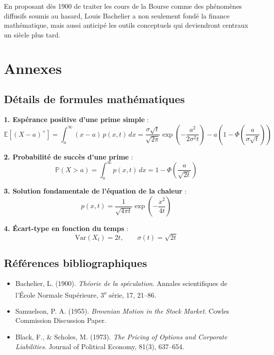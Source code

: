 \documentclass[12pt,a4paper]{article}
\begin{document}
En proposant dès 1900 de traiter les cours de la Bourse comme des phénomènes diffusifs soumis au hasard, Louis Bachelier a non seulement fondé la finance mathématique, mais aussi anticipé les outils conceptuels qui deviendront centraux un siècle plus tard.

\appendix
\section{Annexes}

\subsection{Détails de formules mathématiques}

\textbf{1. Espérance positive d’une prime simple} :
\[
\mathbb{E}[(X - a)^+] = \int_a^{\infty} (x - a)\, p(x,t)\, dx
= \frac{\sigma\sqrt{t}}{\sqrt{2\pi}} \exp\left(-\frac{a^2}{2\sigma^2 t}\right) - a\left(1 - \Phi\left(\frac{a}{\sigma \sqrt{t}}\right)\right)
\]

\textbf{2. Probabilité de succès d’une prime} :
\[
\mathbb{P}(X > a) = \int_a^{\infty} p(x,t)\, dx = 1 - \Phi\left(\frac{a}{\sqrt{2t}}\right)
\]

\textbf{3. Solution fondamentale de l’équation de la chaleur} :
\[
p(x,t) = \frac{1}{\sqrt{4\pi t}} \exp\left(-\frac{x^2}{4t}\right)
\]

\textbf{4. Écart-type en fonction du temps} :
\[
\text{Var}(X_t) = 2t, \qquad \sigma(t) = \sqrt{2t}
\]

\subsection{Références bibliographiques}

\begin{itemize}
    \item Bachelier, L. (1900). \textit{Théorie de la spéculation}. Annales scientifiques de l’École Normale Supérieure, 3\textsuperscript{e} série, 17, 21–86.

    \item Samuelson, P. A. (1955). \textit{Brownian Motion in the Stock Market}. Cowles Commission Discussion Paper.

    \item Black, F., \& Scholes, M. (1973). \textit{The Pricing of Options and Corporate Liabilities}. Journal of Political Economy, 81(3), 637–654.
\end{itemize}
\end{document}
